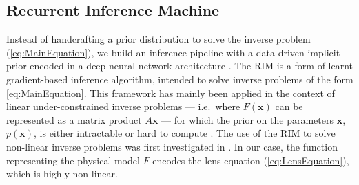 \subsection{Recurrent Inference Machine}\label{sec:rim}

Instead of handcrafting a prior distribution to solve the inverse problem (\ref{eq:MainEquation}), we build an inference pipeline with
a data-driven implicit prior encoded in a deep neural network architecture \citep{Bengio2009}.
The RIM \citep{Putzky2017} is a form of learnt
gradient-based inference algorithm, intended to solve inverse problems of the form  \eqref{eq:MainEquation}. This framework has mainly been applied in the context of linear under-constrained inverse problems --- i.e.\ where $F(\mathbf{x})$ can be represented as a matrix product $A\mathbf{x}$ --- for which the prior on the parameters $\mathbf{x}$, $p(\mathbf{x})$, is 
either intractable or hard to compute \citep{Morningstar2018,Morningstar2019,Lonning2019}. 
The use of the RIM to solve non-linear inverse problems was first investigated in \citep{Modi2021}.
In our case, the function representing the physical model $F$ encodes the lens equation (\ref{eq:LensEquation}), which is highly non-linear. 



